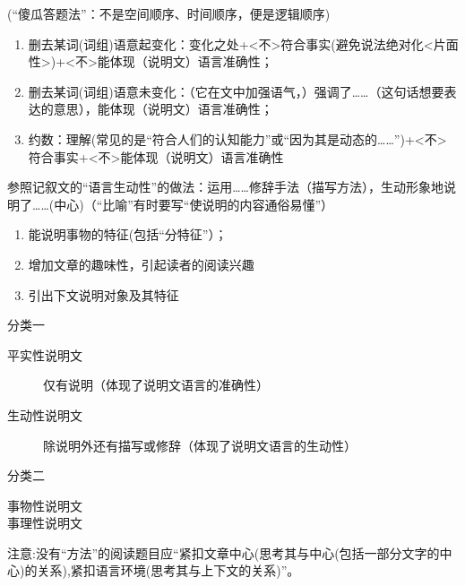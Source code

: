 (``傻瓜答题法''：不是空间顺序、时间顺序，便是逻辑顺序)
\begin{enumerate}
\item 删去某词(词组)语意起变化：变化之处+<不>符合事实(避免说法绝对化<片面性>)+<不>能体现（说明文）语言准确性；
\item 删去某词(词组)语意未变化：（它在文中加强语气，）强调了\ldots{}\ldots{}（这句话想要表达的意思），能体现（说明文）语言准确性；
\item 约数：理解(常见的是``符合人们的认知能力''或``因为其是动态的\ldots{}\ldots{}'')+<不>符合事实+<不>能体现（说明文）语言准确性
\end{enumerate}
参照记叙文的``语言生动性''的做法：运用\ldots{}\ldots{}修辞手法（描写方法），生动形象地说明了\ldots{}\ldots{}(中心)（``比喻''有时要写``使说明的内容通俗易懂''）
\begin{enumerate}
\item 能说明事物的特征(包括``分特征''）；
\item 增加文章的趣味性，引起读者的阅读兴趣
\item 引出下文说明对象及其特征
\end{enumerate}
分类一
\begin{description}
\item[平实性说明文]仅有说明（体现了说明文语言的准确性）
\item[生动性说明文]除说明外还有描写或修辞（体现了说明文语言的生动性）
\end{description}
分类二
\begin{description}
\item[事物性说明文]
\item[事理性说明文]
\end{description}

注意:没有``方法''的阅读题目应``紧扣文章中心(思考其与中心(包括一部分文字的中心)的关系),紧扣语言环境(思考其与上下文的关系)''。